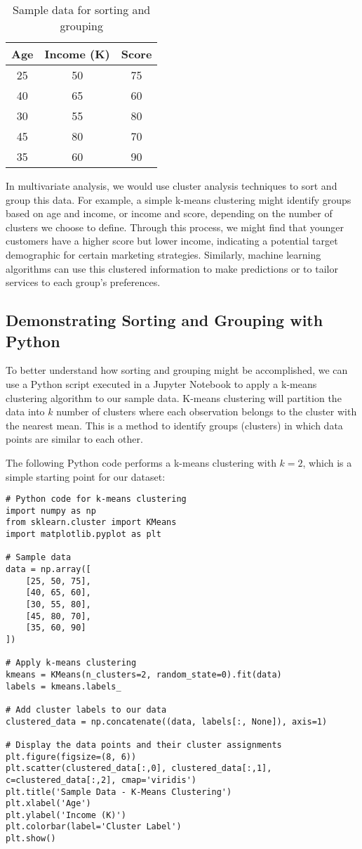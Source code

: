 \documentclass[a4paper,12pt]{book}
\newcounter{example}
\begin{document}
\begin{table}[h]
\centering
\begin{tabular}{c c c}
\hline
\textbf{Age} & \textbf{Income (K)} & \textbf{Score} \\
\hline
25 & 50 & 75 \\
40 & 65 & 60 \\
30 & 55 & 80 \\
45 & 80 & 70 \\
35 & 60 & 90 \\
\hline
\end{tabular}
\caption{Sample data for sorting and grouping}
\label{tab:sample_data}
\end{table}

In multivariate analysis, we would use cluster analysis techniques to sort and group this data. For example, a simple k-means clustering might identify groups based on age and income, or income and score, depending on the number of clusters we choose to define. Through this process, we might find that younger customers have a higher score but lower income, indicating a potential target demographic for certain marketing strategies. Similarly, machine learning algorithms can use this clustered information to make predictions or to tailor services to each group's preferences.

\subsection{Demonstrating Sorting and Grouping with Python}
To better understand how sorting and grouping might be accomplished, we can use a Python script executed in a Jupyter Notebook to apply a k-means clustering algorithm to our sample data. K-means clustering will partition the data into $k$ number of clusters where each observation belongs to the cluster with the nearest mean. This is a method to identify groups (clusters) in which data points are similar to each other.

The following Python code performs a k-means clustering with $k=2$, which is a simple starting point for our dataset:

\begin{verbatim}
# Python code for k-means clustering
import numpy as np
from sklearn.cluster import KMeans
import matplotlib.pyplot as plt

# Sample data
data = np.array([
    [25, 50, 75],
    [40, 65, 60],
    [30, 55, 80],
    [45, 80, 70],
    [35, 60, 90]
])

# Apply k-means clustering
kmeans = KMeans(n_clusters=2, random_state=0).fit(data)
labels = kmeans.labels_

# Add cluster labels to our data
clustered_data = np.concatenate((data, labels[:, None]), axis=1)

# Display the data points and their cluster assignments
plt.figure(figsize=(8, 6))
plt.scatter(clustered_data[:,0], clustered_data[:,1], c=clustered_data[:,2], cmap='viridis')
plt.title('Sample Data - K-Means Clustering')
plt.xlabel('Age')
plt.ylabel('Income (K)')
plt.colorbar(label='Cluster Label')
plt.show()
\end{verbatim}
\end{document}
